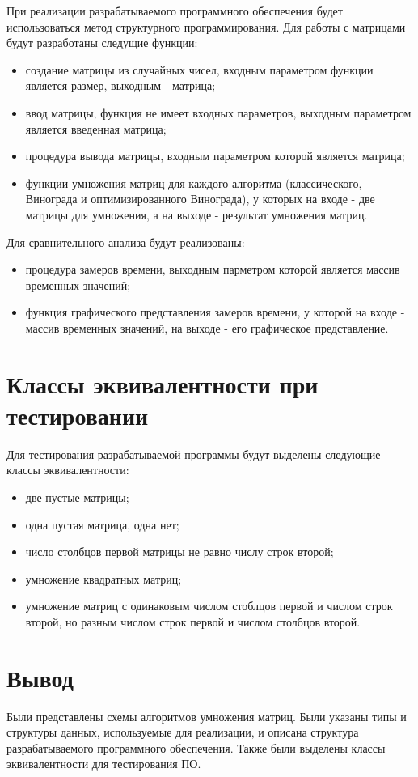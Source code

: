 При реализации разрабатываемого программного обеспечения будет использоваться метод структурного программирования. Для работы с матрицами будут разработаны следущие функции:

\begin{itemize}
	\item создание матрицы из случайных чисел, входным параметром функции является размер, выходным - матрица;
	\item ввод матрицы, функция не имеет входных параметров, выходным параметром является введенная матрица;
	\item процедура вывода матрицы, входным параметром которой является матрица;
	\item функции умножения матриц для каждого алгоритма (классического, Винограда и оптимизированного Винограда), у которых на входе - две матрицы для умножения, а на выходе - результат умножения матриц. 
\end{itemize}

Для сравнительного анализа будут реализованы:

\begin{itemize}
	\item процедура замеров времени, выходным парметром которой является массив временных значений;
	\item функция графического представления замеров времени, у которой на входе - массив временных значений, на выходе - его графическое представление.
\end{itemize}

\section{Классы эквивалентности при тестировании}

Для тестирования разрабатываемой программы будут выделены следующие классы эквивалентности:

\begin{itemize}
	\item две пустые матрицы;
	\item одна пустая матрица, одна нет;
	\item число столбцов первой матрицы не равно числу строк второй;
	\item умножение квадратных матриц;
	\item умножение матриц с одинаковым числом стоблцов первой и числом строк второй, но разным числом строк первой и числом столбцов второй.
\end{itemize}

\section{Вывод}

Были представлены схемы алгоритмов умножения матриц. Были указаны типы и структуры данных, используемые для реализации, и описана структура разрабатываемого программного обеспечения. Также были выделены классы эквивалентности для тестирования ПО.
